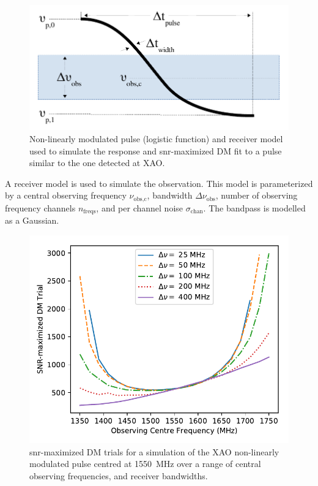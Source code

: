 \documentclass[a4paper,fleqn,usenatbib]{mnras}
\begin{document}
\begin{figure}
    \includegraphics[width=1.0\linewidth]{figures/simulation_diagram.pdf}
    \caption{Non-linearly modulated pulse (logistic function) and receiver model
    used to simulate the response and \gls{snr}-maximized DM fit to a pulse
    similar to the one detected at XAO.
    }
    \label{fig:xao_simulation_diagram}
\end{figure}

A receiver model is used to simulate the observation. This model is
parameterized by a central observing frequency $\nu_{\textrm{obs,c}}$, bandwidth
$\Delta \nu_{\textrm{obs}}$, number of observing frequency channels
$n_{\textrm{freqs}}$, and per channel noise $\sigma_{\textrm{chan}}$. The
bandpass is modelled as a Gaussian.

\begin{figure}
    \includegraphics[width=1.0\linewidth]{figures/simulatedRADARdm.pdf}
    \caption{\gls{snr}-maximized DM trials for a simulation of the XAO
    non-linearly modulated pulse centred at 1550~MHz over a range of central
    observing frequencies, and receiver bandwidths.
    }
    \label{fig:xao_simulated_dm}
\end{figure}
\end{document}
